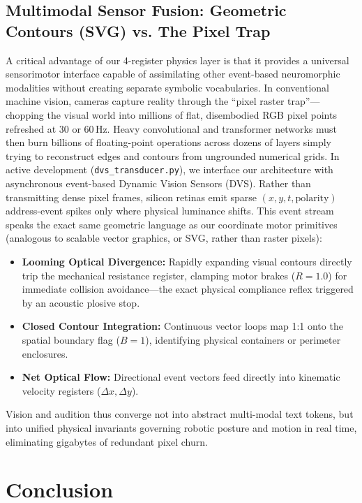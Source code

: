 \documentclass[journal,twocolumn]{IEEEtran}
\begin{document}
\subsection{Multimodal Sensor Fusion: Geometric Contours (SVG) vs. The Pixel Trap}
A critical advantage of our 4-register physics layer is that it provides a universal sensorimotor interface capable of assimilating other event-based neuromorphic modalities without creating separate symbolic vocabularies. In conventional machine vision, cameras capture reality through the ``pixel raster trap''---chopping the visual world into millions of flat, disembodied RGB pixel points refreshed at 30 or 60\,Hz. Heavy convolutional and transformer networks must then burn billions of floating-point operations across dozens of layers simply trying to reconstruct edges and contours from ungrounded numerical grids. In active development (\texttt{dvs\_transducer.py}), we interface our architecture with asynchronous event-based Dynamic Vision Sensors (DVS). Rather than transmitting dense pixel frames, silicon retinas emit sparse $(x, y, t, \text{polarity})$ address-event spikes only where physical luminance shifts. This event stream speaks the exact same geometric language as our coordinate motor primitives (analogous to scalable vector graphics, or SVG, rather than raster pixels):
\begin{itemize}
    \item \textbf{Looming Optical Divergence:} Rapidly expanding visual contours directly trip the mechanical resistance register, clamping motor brakes ($R = 1.0$) for immediate collision avoidance---the exact physical compliance reflex triggered by an acoustic plosive stop.
    \item \textbf{Closed Contour Integration:} Continuous vector loops map 1:1 onto the spatial boundary flag ($B = 1$), identifying physical containers or perimeter enclosures.
    \item \textbf{Net Optical Flow:} Directional event vectors feed directly into kinematic velocity registers ($\Delta x, \Delta y$).
\end{itemize}

Vision and audition thus converge not into abstract multi-modal text tokens, but into unified physical invariants governing robotic posture and motion in real time, eliminating gigabytes of redundant pixel churn.

\section{Conclusion}
\label{sec:conclusion}
\end{document}
